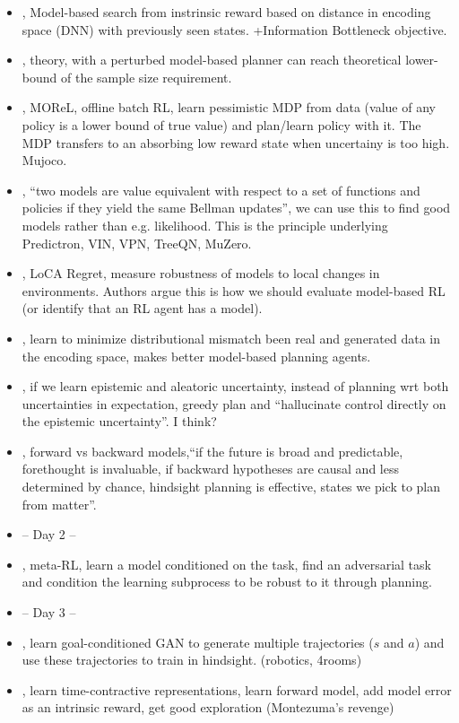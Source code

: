 \begin{itemize}
  \item \citet{tao2020novelty}, Model-based search from instrinsic reward based on distance in encoding space (DNN) with previously seen states. +Information Bottleneck objective.
  \item \citet{li2020breaking}, theory, with a perturbed model-based planner can reach theoretical lower-bound of the sample size requirement.
  \item \citet{kidambi2020morel}, MOReL, offline batch RL, learn pessimistic MDP from data (value of any policy is a lower bound of true value) and plan/learn policy with it. The MDP transfers to an absorbing low reward state when uncertainy is too high. Mujoco.
  \item \citet{grimm2020value}, ``two models are value equivalent with respect to a set of functions and policies if they yield the same Bellman updates'', we can use this to find good models rather than e.g. likelihood. This is the principle underlying Predictron, VIN, VPN, TreeQN, MuZero.
  \item \citet{van2020loca}, LoCA Regret, measure robustness of models to local changes in environments. Authors argue this is how we should evaluate model-based RL (or identify that an RL agent has a model).
  \item \citet{shen2020model}, learn to minimize distributional mismatch been real and generated data in the encoding space, makes better model-based planning agents.
  \item \citet{curi2020efficient}, if we learn epistemic and aleatoric uncertainty, instead of planning wrt both uncertainties in expectation, greedy plan and ``hallucinate control directly on the epistemic uncertainty''. I think?
  \item \citet{chelu2020forethought}, forward vs backward models,``if the future is broad and predictable, forethought is invaluable, if backward hypotheses are causal and less determined by chance, hindsight planning is effective, states we pick to plan from matter''.
  \item -- Day 2 --
  \item \citet{lin2020model}, meta-RL, learn a model conditioned on the task, find an adversarial task and condition the learning subprocess to be robust to it through planning.
  \item -- Day 3 --
  \item \citet{charlesworth2020plangan}, learn goal-conditioned GAN to generate multiple trajectories ($s$ and $a$) and use these trajectories to train in hindsight. (robotics, 4rooms)
    \item \citet{ermolov2020latent}, learn time-contractive representations, learn forward model, add model error as an intrinsic reward, get good exploration (Montezuma's revenge)
\end{itemize}


